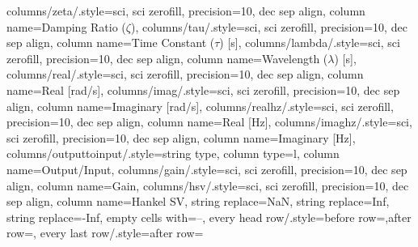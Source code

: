 {columns/zeta/.style={sci, sci zerofill, precision=10, dec sep align, column name={Damping Ratio ($\zeta$)}},
columns/tau/.style={sci, sci zerofill, precision=10, dec sep align, column name={Time Constant ($\tau$) [\si{\s}]}},
columns/lambda/.style={sci, sci zerofill, precision=10, dec sep align, column name={Wavelength ($\lambda$) [\si{\s}]}},
columns/real/.style={sci, sci zerofill, precision=10, dec sep align, column name={Real [\si{\radian/\s}]}},
columns/imag/.style={sci, sci zerofill, precision=10, dec sep align, column name={Imaginary [\si{\radian/\s}]}},
columns/realhz/.style={sci, sci zerofill, precision=10, dec sep align, column name={Real [\si{\hertz}]}},
columns/imaghz/.style={sci, sci zerofill, precision=10, dec sep align, column name={Imaginary [\si{\hertz}]}},
columns/outputtoinput/.style={string type, column type=l, column name={Output/Input}},
columns/gain/.style={sci, sci zerofill, precision=10, dec sep align, column name={Gain}},
columns/hsv/.style={sci, sci zerofill, precision=10, dec sep align, column name={Hankel SV}},
string replace={NaN}{},
string replace={Inf}{},
string replace={-Inf}{},
empty cells with={--},
every head row/.style={before row=\toprule,after row=\midrule},
every last row/.style={after row=\bottomrule}}
